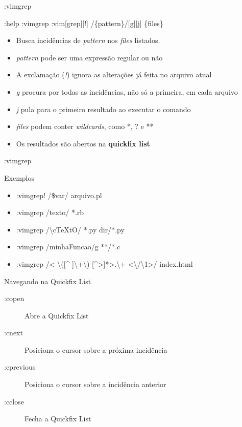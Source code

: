 \begin{frame}{:vimgrep}
	\begin{block}{:help :vimgrep}
		:vim[grep][!] /\{pattern\}/[g][j] \{files\}
	\end{block}
	\begin{itemize}
		\item Busca incidências de \textit{pattern} nos \textit{files} listados.
		\item \textit{pattern} pode ser uma expressão regular ou não
		\item A exclamação (\textit{!}) ignora as alterações já feita no arquivo atual
		\item \textit{g} procura por todas as incidências, não só a primeira, em cada arquivo
		\item \textit{j} pula para o primeiro resultado ao executar o comando
		\item \textit{files} podem conter \textit{wildcards}, como *, ? e **
		\item Os resultados são abertos na \textbf{quickfix list}
	\end{itemize}
\end{frame}
\begin{frame}{:vimgrep}
	\begin{block}{Exemplos}
	\begin{itemize}
		\item :vimgrep! /\$var/ arquivo.pl
		\item :vimgrep /texto/ *.rb
		\item :vimgrep /\textbackslash{}cTeXtO/ *.py dir/*.py
		\item :vimgrep /minhaFuncao/g **/*.c
		\item :vimgrep /\textless%
			\textbackslash{}([\textasciicircum{} ]\textbackslash+\textbackslash{})%
			[\textasciicircum{}\textgreater]*\textgreater.\textbackslash{}+%
			\textless\textbackslash{}/\textbackslash{}1\textgreater/ index.html
	\end{itemize}
	\end{block}
	\begin{block}{Navegando na Quickfix List}
	\begin{description}
		\item[:copen] Abre a Quickfix List
		\item[:cnext] Posiciona o cursor sobre a próxima incidência
		\item[:cprevious] Posiciona o cursor sobre a incidência anterior
		\item[:cclose] Fecha a Quickfix List
	\end{description}
	\end{block}
\end{frame}
